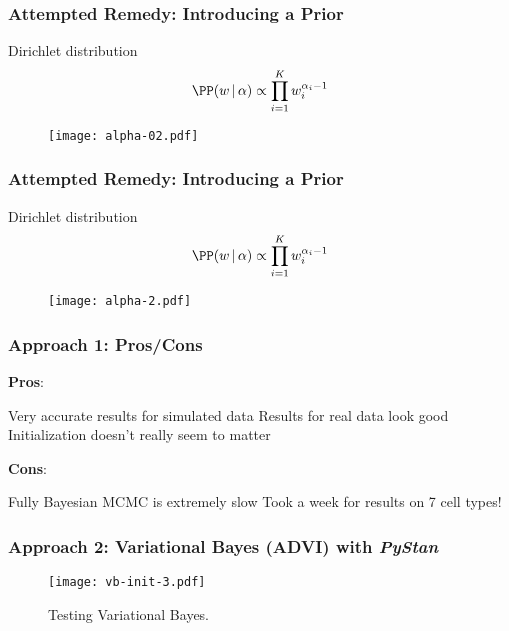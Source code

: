 \documentclass{beamer}
\newcommand{\importfig}[1]{{#1.tex}}
\begin{document}
\begin{frame}
    \frametitle{Attempted Remedy: Introducing a Prior}
    \begin{block}{Dirichlet distribution}
        \[
        \PP(w \,|\, \alpha) \propto \prod\limits_{i=1}^{K} w_i^{\alpha_i-1}
        \]
    \end{block}

    \begin{figure}[!htbp]
        \centering
        \texttt{[image: alpha-02.pdf]}
    \end{figure}
\end{frame}

\begin{frame}
    \frametitle{Attempted Remedy: Introducing a Prior}
    \begin{block}{Dirichlet distribution}
        \[
        \PP(w \,|\, \alpha) \propto \prod\limits_{i=1}^{K} w_i^{\alpha_i-1}
        \]
    \end{block}

    \begin{figure}[!htbp]
        \centering
        \texttt{[image: alpha-2.pdf]}
    \end{figure}
\end{frame}

\begin{frame}
    \frametitle{Approach 1: Pros/Cons}
    \begin{itemize}
        \ii \textbf{Pros}:
        \begin{itemize}
            \ii Very accurate results for simulated data
            \ii Results for real data look good
            \ii Initialization doesn't really seem to matter
        \end{itemize}
        \ii \textbf{Cons}:
        \begin{itemize}
            \ii Fully Bayesian MCMC is \alert{extremely slow}
            \ii Took a \alert{week} for results on 7 cell types!
        \end{itemize}
    \end{itemize}
\end{frame}

\begin{frame}
    \frametitle{Approach 2: Variational Bayes (ADVI) with \textit{PyStan}}
    \begin{figure}[!htbp]
        \centering
        \texttt{[image: vb-init-3.pdf]}
        \caption{Testing Variational Bayes.}
    \end{figure}
\end{frame}
\end{document}
